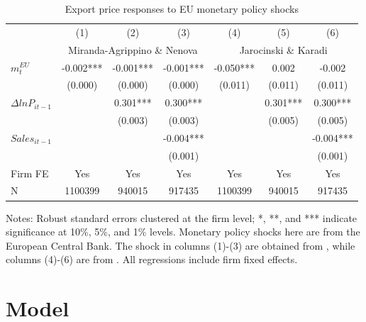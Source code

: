 \begin{table}[htbp]
    \centering
    \caption{Export price responses to EU monetary policy shocks}
    \begin{threeparttable}
    \begin{tabular}{lcccccc}
        \toprule
        & (1)   & (2)   & (3)   & (4)   & (5)   & (6) \\
        & \multicolumn{3}{c}{Miranda-Agrippino \& Nenova} & \multicolumn{3}{c}{Jarocinski \& Karadi}  \\
        \midrule
        $m^{EU}_t$ & -0.002*** & -0.001*** & -0.001*** & -0.050*** & 0.002 & -0.002 \\
              & (0.000) & (0.000) & (0.000) & (0.011) & (0.011) & (0.011)\\  
        $\Delta ln P_{it-1}$ &       & 0.301*** & 0.300*** &       & 0.301*** & 0.300*** \\
              &       & (0.003) & (0.003) &       & (0.005) & (0.005) \\
        $Sales_{it-1}$ &       &       & -0.004*** &       &       & -0.004*** \\
              &       &       & (0.001) &       &       & (0.001) \\
        \midrule
        Firm FE & Yes   & Yes   & Yes   & Yes   & Yes   & Yes \\
         N     & 1100399 & 940015 & 917435 & 1100399 & 940015 & 917435 \\
        \bottomrule
    \end{tabular}
        \begin{tablenotes}
            \footnotesize
            \item Notes: Robust standard errors clustered at the firm level;  *, **, and *** indicate significance at 10\%, 5\%, and 1\% levels. Monetary policy shocks here are from the European Central Bank. The shock in columns (1)-(3) are obtained from \cite{miranda2022tale}, while columns (4)-(6) are  from \cite{jarocinski2020deconstructing}. All regressions include firm fixed effects.
	\end{tablenotes}
    \end{threeparttable}
    \label{tab.EU}
\end{table}


\newpage
\section{Model}

